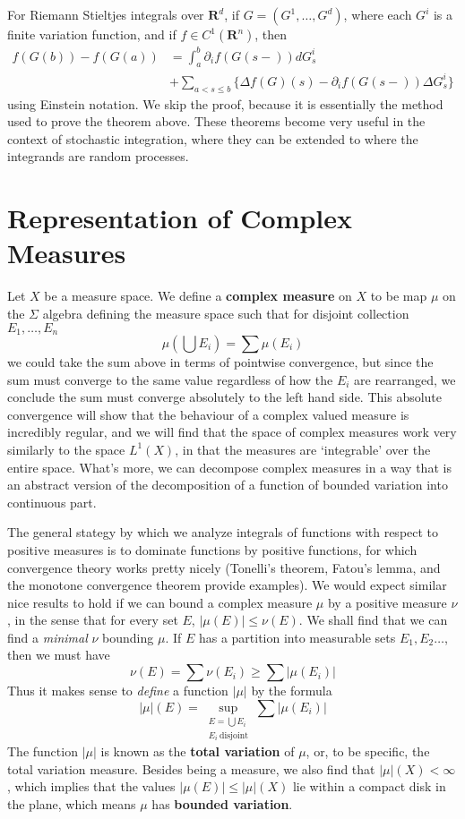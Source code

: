 For Riemann Stieltjes integrals over $\mathbf{R}^d$, if $G = (G^1, \dots, G^d)$, where each $G^i$ is a finite variation function, and if $f \in C^1(\mathbf{R}^n)$, then
%
\begin{align*}
    f(G(b)) - f(G(a)) &= \int_a^b \partial_i f(G(s-)) dG^i_s\\
    &+ \sum_{a < s \leq b} \{ \Delta f(G) (s) - \partial_i f(G(s-)) \Delta G^i_s \}
\end{align*}
%
using Einstein notation. We skip the proof, because it is essentially the method used to prove the theorem above. These theorems become very useful in the context of stochastic integration, where they can be extended to where the integrands are random processes.











\section{Representation of Complex Measures}

Let $X$ be a measure space. We define a {\bf complex measure} on $X$ to be map $\mu$ on the $\Sigma$ algebra defining the measure space such that for disjoint collection $E_1, \dots, E_n$
%
\[ \mu \left( \bigcup E_i \right) = \sum \mu(E_i) \]
%
we could take the sum above in terms of pointwise convergence, but since the sum must converge to the same value regardless of how the $E_i$ are rearranged, we conclude the sum must converge absolutely to the left hand side. This absolute convergence will show that the behaviour of a complex valued measure is incredibly regular, and we will find that the space of complex measures work very similarly to the space $L^1(X)$, in that the measures are `integrable' over the entire space. What's more, we can decompose complex measures in a way that is an abstract version of the decomposition of a function of bounded variation into continuous part.

The general stategy by which we analyze integrals of functions with respect to positive measures is to dominate functions by positive functions, for which convergence theory works pretty nicely (Tonelli's theorem, Fatou's lemma, and the monotone convergence theorem provide examples). We would expect similar nice results to hold if we can bound a complex measure $\mu$ by a positive measure $\nu$, in the sense that for every set $E$, $|\mu(E)| \leq \nu(E)$. We shall find that we can find a {\it minimal} $\nu$ bounding $\mu$. If $E$ has a partition into measurable sets $E_1, E_2 \dots$, then we must have
%
\[ \nu(E) = \sum \nu(E_i) \geq \sum |\mu(E_i)| \]
%
Thus it makes sense to {\it define} a function $|\mu|$ by the formula
%
\[ |\mu|(E) = \sup_{\substack{E = \bigcup E_i\\E_i\ \text{disjoint}}} \sum |\mu(E_i)| \]
%
The function $|\mu|$ is known as the {\bf total variation} of $\mu$, or, to be specific, the total variation measure. Besides being a measure, we also find that $|\mu|(X) < \infty$, which implies that the values $|\mu(E)| \leq |\mu|(X)$ lie within a compact disk in the plane, which means $\mu$ has {\bf bounded variation}.

